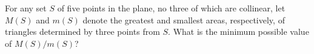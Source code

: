 For any set $S$ of five points in the plane, no three of which are collinear, let $M(S)$ and $m(S)$ denote the greatest and smallest areas, respectively, of triangles determined by three points from $S$. What is the minimum possible value of $M(S)/m(S)$?
